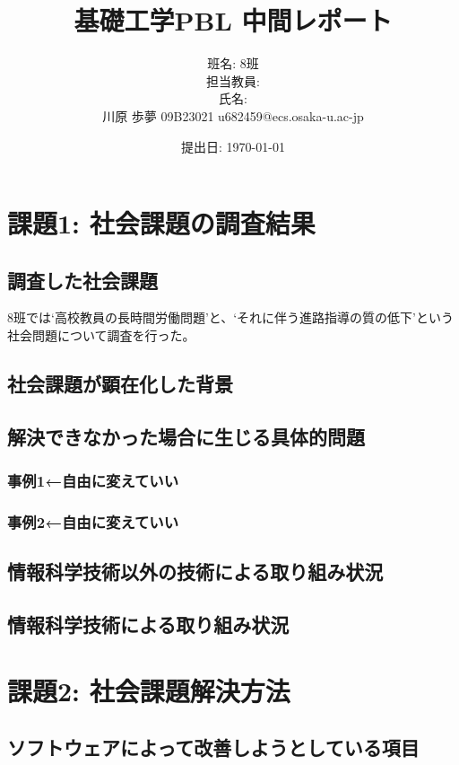 \documentclass[a4j, titlepage]{jarticle}
\title{基礎工学PBL 中間レポート}
\author{班名: 8班\\担当教員: \\氏名: \\ 川原 歩夢 09B23021 u682459@ecs.osaka-u.ac-jp}
\date{提出日: \today}
\begin{document}
\maketitle

\section{課題1: 社会課題の調査結果}
\subsection{調査した社会課題}
8班では`高校教員の長時間労働問題'と、`それに伴う進路指導の質の低下'という社会問題について調査を行った。

\subsection{社会課題が顕在化した背景}


\subsection{解決できなかった場合に生じる具体的問題}
\subsubsection{事例1←自由に変えていい}

\subsubsection{事例2←自由に変えていい}

\subsection{情報科学技術以外の技術による取り組み状況}

\subsection{情報科学技術による取り組み状況}

\section{課題2: 社会課題解決方法}
\subsection{ソフトウェアによって改善しようとしている項目}
\end{document}
